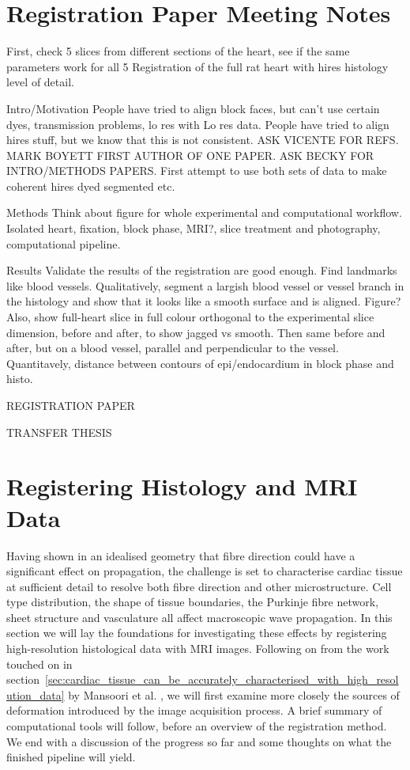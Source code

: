 
% 
% 
\section{Registration Paper Meeting Notes}
First, check 5 slices from different sections of the heart, see if the same parameters work for all 5
Registration of the full rat heart with hires histology level of detail.


Intro/Motivation
People have tried to align block faces, but can't use certain dyes, transmission problems, lo res with Lo res data.
People have tried to align hires stuff, but we know that this is not consistent.
ASK VICENTE FOR REFS. MARK BOYETT FIRST AUTHOR OF ONE PAPER. ASK BECKY FOR INTRO/METHODS PAPERS.
First attempt to use both sets of data to make coherent hires dyed segmented etc.

Methods
Think about figure for whole experimental and computational workflow. Isolated heart, fixation, block phase, MRI?, slice treatment and photography, computational pipeline.

Results
Validate the results of the registration are good enough. Find landmarks like blood vessels. Qualitatively, segment a largish blood vessel or vessel branch in the histology and show that it looks like a smooth surface and is aligned. Figure? Also, show full-heart slice in full colour orthogonal to the experimental slice dimension, before and after, to show jagged vs smooth. Then same before and after, but on a blood vessel, parallel and perpendicular to the vessel. Quantitavely, distance between contours of epi/endocardium in block phase and histo.



REGISTRATION PAPER




TRANSFER THESIS
\section{Registering Histology and MRI Data} %

\label{cha:registering_histology_and_mri_data}
  Having shown in an idealised geometry that fibre direction could have a significant effect on propagation, the challenge is set to characterise cardiac tissue at sufficient detail to resolve both fibre direction and other microstructure. Cell type distribution, the shape of tissue boundaries, the Purkinje fibre network, sheet structure and vasculature all affect macroscopic wave propagation. In this section we will lay the foundations for investigating these effects by registering high-resolution histological data with MRI images. Following on from the work touched on in section~\ref{sec:cardiac_tissue_can_be_accurately_characterised_with_high_resolution_data} by Mansoori et al. \cite{Mansoori:2007p221}, we will first examine more closely the sources of deformation introduced by the image acquisition process. A brief summary of computational tools will follow, before an overview of the registration method. We end with a discussion of the progress so far and some thoughts on what the finished pipeline will yield.
  
